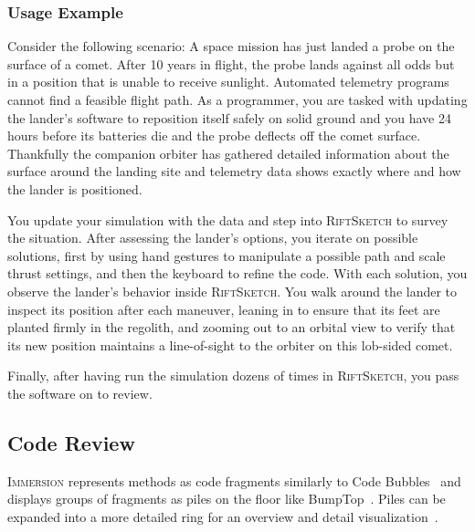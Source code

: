 \documentclass[conference]{IEEEtran}
\begin{document}
\subsubsection{Usage Example}
Consider the following scenario: A space mission has just landed a probe on the surface of a comet.
After 10 years in flight, the probe lands against all odds but in a position that is unable to receive sunlight.
Automated telemetry programs cannot find a feasible flight path.
As a programmer, you are tasked with updating the lander's software to reposition itself safely on solid ground and you have 24 hours before its batteries die and the probe deflects off the comet surface. 
Thankfully the companion orbiter has gathered detailed information about the surface around the landing site and telemetry data shows exactly where and how the lander is positioned.

You update your simulation with the data and step into \textsc{RiftSketch} to survey the situation. 
After assessing the lander's options, you iterate on possible solutions, first by using hand gestures to manipulate a possible path and scale thrust settings, 
and then the keyboard to refine the code. 
With each solution, you observe the lander's behavior inside \textsc{RiftSketch}.
You walk around the lander to inspect its position after each maneuver, leaning in to ensure that its feet are planted firmly in the regolith, and zooming out to an orbital view to verify that its new position maintains a line-of-sight to the orbiter on this lob-sided comet. 

Finally, after having run the simulation dozens of times in \textsc{RiftSketch}, you pass the software on to review.




\subsection{Code Review}


\textsc{Immersion} represents methods as code fragments similarly to Code Bubbles~\cite{Bragdon:CodeBubbles} and displays groups of fragments as piles on the floor like BumpTop~\cite{Agarawala:BumpTop}.
Piles can be expanded into a more detailed ring for an overview and detail visualization~\cite{Shneiderman:InfoVisTaxonomy}.
\end{document}
